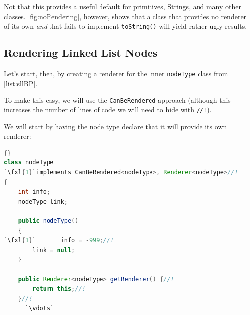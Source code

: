 \documentclass[11pt,titlepage]{book}
\def\fxl#1{%
\newdimen\fxlheight\setlength{\fxlheight}{#1\baselineskip}%
\advance\fxlheight by -0.5\baselineskip%
\begin{picture}(0,0)%
\setlength{\unitlength}{\baselineskip}%
\put(0,0){\makebox(0,0.75)[tl]{%
\colorbox{paleyellow}{%
\rule{0pt}{\fxlheight}%
\rule{\linewidth}{0pt}}%
}}\end{picture}%
}
\begin{document}
\begin{itemize}
\begin{enumerate}
    Not that this provides a useful default for primitives, Strings,
    and many other classes. \autoref{fig:noRendering}, however, shows
    that a class that provides no renderer of its own {\em and} that
    fails to implement \texttt{toString()} will yield rather ugly
    results.
  \end{enumerate}

\end{itemize}

\subsection{Rendering Linked List Nodes}

Let's start, then, by creating a renderer for the inner \texttt{nodeType} class from \autoref{list:sllBP}.

To make this easy, we will use the \texttt{CanBeRendered} approach
(although this increases the number of lines of code we will need to
hide with \texttt{//!}).

We will start by having the node type declare that it will provide its own renderer:
\begin{lstlisting}[language=Java,frame=tb]{}
class nodeType 
`\fxl{1}`implements CanBeRendered<nodeType>, Renderer<nodeType>//!
{
    int info;
    nodeType link;
    
    public nodeType()
    {
`\fxl{1}`    	info = -999;//!
    	link = null;
    }

    public Renderer<nodeType> getRenderer() {//!
        return this;//!
    }//!
      `\vdots`
\end{lstlisting}
\end{document}
